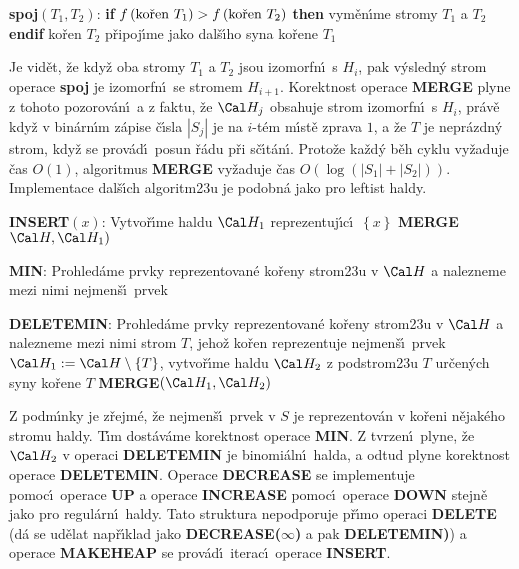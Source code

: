 {\bf spoj$\left(T_1,T_2\right)$}:\newline 
{\bf if} $f\left(\text{\rm ko\v ren }T_1\right)>f\left(\text{\rm ko\v ren }T_2\right)$ {\bf then}\newline 
\phantom{---}vym\v en\'\i me stromy $T_1$ a $T_2$\newline 
{\bf endif}\newline 
ko\v ren $T_2$ p\v ripoj\'\i me jako dal\v s\'\i ho syna ko\v rene $
T_1$
\medskip

\flushpar Je vid\v et, \v ze kdy\v z oba stromy $T_1$ a $T_2$ jsou 
izomorfn\'\i\ s $H_i$, pak v\'ysledn\'y strom operace {\bf spoj} je 
izomorfn\'\i\ se stromem $H_{i+1}$. Korektnost ope\-race {\bf MERGE} plyne z tohoto pozorov\'an\'\i\ a z faktu, \v ze $\Cal H_j$ obsahuje strom 
izomorfn\'\i\ s $H_i$, pr\'av\v e kdy\v z v bin\'arn\'\i m z\'apise 
\v c\'\i sla $|S_j|$ je na $i$-t\'em 
m\'\i st\v e zprava $1$, a \v ze $T$ je nepr\'azdn\'y strom, kdy\v z se 
prov\'ad\'\i\ posun \v r\'adu p\v ri s\v c\'\i t\'an\'\i . Proto\v ze ka\v zd\'y b\v eh 
cyklu vy\v zaduje \v cas $O\left(1\right)$, algoritmus {\bf MER\-GE} vy\v zaduje \v cas 
$O\left(\log\left(|S_1|+|S_2|\right)\right)$. Implementace dal\v s\'\i ch algoritm\accent23u 
je podobn\'a jako pro leftist haldy. 
\bigskip

{\bf INSERT$\left(x\right)$}:\newline 
Vytvo\v r\'\i me haldu $\Cal H_1$ reprezentuj\'\i c\'\i\ $\left\{x\right\}$\newline 
{\bf MERGE}$\Cal H,\Cal H_1)$
\bigskip

{\bf MIN}:\newline 
Prohled\'ame prvky reprezentovan\'e ko\v reny strom\accent23u 
v $\Cal H$ a nalez\-ne\-me mezi nimi nejmen\v s\'\i\ prvek
\bigskip

{\bf DELETEMIN}:\newline 
Prohled\'ame prvky reprezentovan\'e ko\v reny strom\accent23u 
v $\Cal H$ a nalez\-neme mezi nimi strom $T$, jeho\v z ko\v ren reprezentuje 
nejmen\v s\'\i\ prvek\newline
$\Cal H_1:=\Cal H\setminus \left\{T\right\}$, vytvo\v r\'\i me haldu $
\Cal H_2$ z podstrom\accent23u $T$ ur\v cen\'ych syny ko\v rene $T$\newline 
{\bf MERGE$\left(\Cal H_1,\Cal H_2\right)$}
\bigskip

\flushpar Z podm\'\i nky  je z\v rejm\'e, \v ze 
nejmen\v s\'\i\ prvek v $S$ je reprezentov\'an v ko\v reni n\v ejak\'eho  
stromu haldy. T\'\i m dost\'av\'ame korekt\-nost ope\-race {\bf MIN}.
Z tvrzen\'\i\ plyne, \v ze $\Cal H_2$ v ope\-raci {\bf DELE\-TE\-MIN} je 
binomi\'aln\'\i\ halda, a odtud plyne korekt\-nost ope\-race 
{\bf DE\-LE\-TEMIN}. Operace {\bf DECREASE} se implementuje pomoc\'\i\ 
ope\-race {\bf UP} a ope\-race {\bf INCREASE} pomoc\'\i\ 
ope\-race {\bf DOWN} stejn\v e jako pro regul\'arn\'\i\ haldy. Tato 
struktura nepodporuje p\v r\'\i mo operaci {\bf DELETE} (d\'a se ud\v elat 
nap\v r\'\i klad jako {\bf DECREASE($\infty$)} a pak {\bf DELETEMIN)}) a ope\-race 
{\bf MAKEHEAP} se prov\'ad\'\i\ iterac\'\i\ operace {\bf INSERT}.
\medskip

